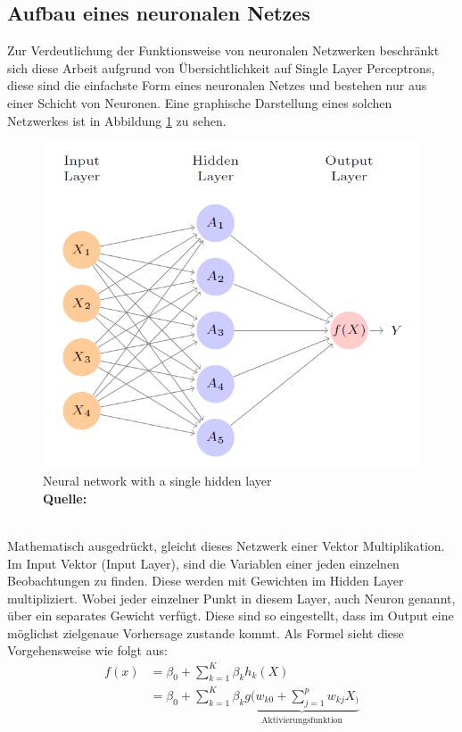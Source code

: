 \documentclass[a4paper,12pt]{thesis}
\newcommand*{\captionsource}[2]{%
	\caption[{#1}]{%
		#1%
		\\\hspace{\linewidth}%
		\textbf{Quelle:} #2%
	}%
}
\begin{document}
\subsection{Aufbau eines neuronalen Netzes}
Zur Verdeutlichung der Funktionsweise von neuronalen Netzwerken beschränkt sich diese Arbeit aufgrund von Übersichtlichkeit auf Single Layer Perceptrons, diese sind die einfachste Form eines neuronalen Netzes und bestehen nur aus einer Schicht von Neuronen. Eine graphische Darstellung eines solchen Netzwerkes ist in Abbildung \ref{NN1} zu sehen.
\begin{figure}[!ht]
	\centering
	\includegraphics[width=12cm]{Plots/NN1.png}
	\captionsource{Neural network with a single hidden layer}{
		\cite{James2013DL}
	}
	\label{NN1}
\end{figure}\\
Mathematisch ausgedrückt, gleicht dieses Netzwerk einer Vektor Multiplikation. Im Input Vektor (Input Layer), sind die Variablen einer jeden einzelnen Beobachtungen zu finden. Diese werden mit Gewichten im Hidden Layer multipliziert. Wobei jeder einzelner Punkt in diesem Layer, auch Neuron genannt, über ein separates Gewicht verfügt. Diese sind so eingestellt, dass im Output eine möglichst zielgenaue Vorhersage zustande kommt. Als Formel sieht diese Vorgehensweise wie folgt aus:
\begin{equation}
	\label{NN:SingleLayerNetwork}
	\begin{aligned}
		f(x)& = \beta_0 + \sum_{k = 1}^K \beta_k h_k (X)\\
		& = \beta_0  + \sum_{k = 1}^K \beta_k \underbrace{ g(w_{k0} + \sum_{j = 1}^p w_{kj} X_)}_{\text{Aktivierungsfunktion}}
	\end{aligned} 
\end{equation}
\end{document}
